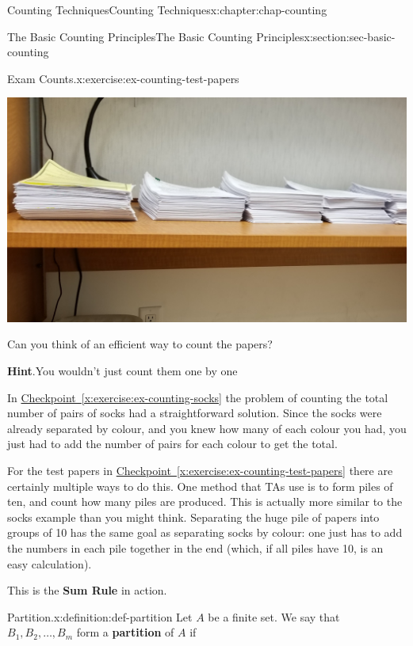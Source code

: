 \documentclass[oneside,10pt,]{book}
\newcommand{\blocktitlefont}{\relax}
\newcommand{\xreffont}{\relax}
\newcommand{\terminology}[1]{\textbf{#1}}
\numberwithin{equation}{section}
\begin{document}
\begin{chapterptx}{Counting Techniques}{}{Counting Techniques}{}{}{x:chapter:chap-counting}
\begin{sectionptx}{The Basic Counting Principles}{}{The Basic Counting Principles}{}{}{x:section:sec-basic-counting}
\begin{inlineexercise}{Exam Counts.}{x:exercise:ex-counting-test-papers}
\begin{sidebyside}{1}{0.25}{0.25}{0}%
\begin{sbspanel}{0.5}%
\includegraphics[width=\linewidth]{figs/test-papers.jpg}
\end{sbspanel}%
\end{sidebyside}%
\par
Can you think of an efficient way to count the papers?%
\par\smallskip%
\noindent\textbf{\blocktitlefont Hint}.\hypertarget{g:hint:id247544}{}\quad{}You wouldn't just count them one by one\textellipsis{}%
\end{inlineexercise}
In \hyperref[x:exercise:ex-counting-socks]{Checkpoint~{\xreffont\ref{x:exercise:ex-counting-socks}}} the problem of counting the total number of pairs of socks had a straightforward solution. Since the socks were already separated by colour, and you knew how many of each colour you had, you just had to add the number of pairs for each colour to get the total.%
\par
For the test papers in \hyperref[x:exercise:ex-counting-test-papers]{Checkpoint~{\xreffont\ref{x:exercise:ex-counting-test-papers}}} there are certainly multiple ways to do this. One method that TAs use is to form piles of ten, and count how many piles are produced. This is actually more similar to the socks example than you might think. Separating the huge pile of papers into groups of 10 has the same goal as separating socks by colour: one just has to add the numbers in each pile together in the end (which, if all piles have 10, is an easy calculation).%
\par
This is the \terminology{Sum Rule} in action.%
\begin{definition}{Partition.}{x:definition:def-partition}%
Let \(A\) be a finite set. We say that \(B_1,B_2,\ldots,B_m\) form a \terminology{partition} of \(A\) if%

\end{definition}
\end{sectionptx}
\end{chapterptx}
\end{document}
